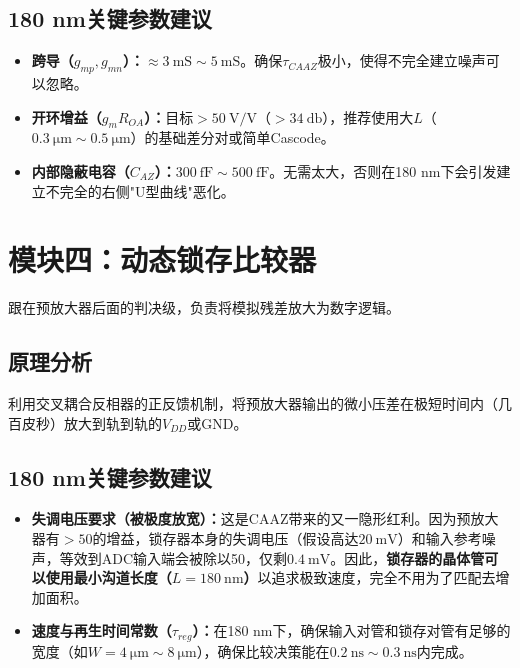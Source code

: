 \documentclass[11pt,a4paper,UTF8]{ctexart}
\begin{document}
\subsection{180 nm关键参数建议}

\begin{itemize}[leftmargin=*]
    \item \textbf{跨导（$g_{mp}, g_{mn}$）：}$\approx \SI{3}{\milli\siemens} \sim \SI{5}{\milli\siemens}$。确保$\tau_{CAAZ}$极小，使得不完全建立噪声可以忽略。
    
    \item \textbf{开环增益（$g_m R_{OA}$）：}目标$> \SI{50}{\volt\per\volt}$（$> \SI{34}{\decibel}$），推荐使用大$L$（$\SI{0.3}{\micro\meter} \sim \SI{0.5}{\micro\meter}$）的基础差分对或简单Cascode。
    
    \item \textbf{内部隐蔽电容（$C_{AZ}$）：}$\SI{300}{\femto\farad} \sim \SI{500}{\femto\farad}$。无需太大，否则在180 nm下会引发建立不完全的右侧"U型曲线"恶化。
\end{itemize}

\section{模块四：动态锁存比较器}

跟在预放大器后面的判决级，负责将模拟残差放大为数字逻辑。

\subsection{原理分析}

利用交叉耦合反相器的正反馈机制，将预放大器输出的微小压差在极短时间内（几百皮秒）放大到轨到轨的$V_{DD}$或GND。

\subsection{180 nm关键参数建议}

\begin{itemize}[leftmargin=*]
    \item \textbf{失调电压要求（被极度放宽）：}这是CAAZ带来的又一隐形红利。因为预放大器有$>50$的增益，锁存器本身的失调电压（假设高达$\SI{20}{\milli\volt}$）和输入参考噪声，等效到ADC输入端会被除以50，仅剩$\SI{0.4}{\milli\volt}$。因此，\textbf{锁存器的晶体管可以使用最小沟道长度（$L=\SI{180}{\nano\meter}$）}以追求极致速度，完全不用为了匹配去增加面积。
    
    \item \textbf{速度与再生时间常数（$\tau_{reg}$）：}在180 nm下，确保输入对管和锁存对管有足够的宽度（如$W = \SI{4}{\micro\meter} \sim \SI{8}{\micro\meter}$），确保比较决策能在$\SI{0.2}{\nano\second} \sim \SI{0.3}{\nano\second}$内完成。
\end{itemize}
\end{document}
